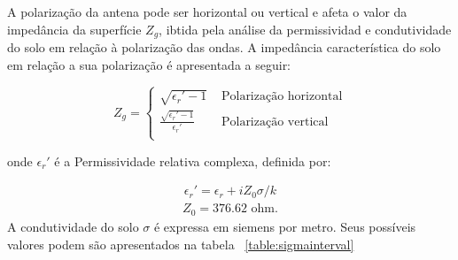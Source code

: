 A polarização da antena pode ser horizontal ou vertical e afeta o valor da impedância da superfície \begin{math}Z_g\end{math}, ibtida pela análise da permissividad e condutividade do solo em relação à polarização das ondas. A impedância característica do solo em relação a sua polarização é apresentada a seguir:

\[
	      Z_g = \begin{cases} 
	 \sqrt{\epsilon_r' - 1} & \textrm{ Polarização horizontal} \\
       \frac{\sqrt{\epsilon_r' - 1}}{\epsilon_r'} & \textrm{ Polarização vertical} \\
   	\end{cases}
\]

onde \begin{math}\epsilon_r'\end{math} é a Permissividade relativa complexa, definida por:

\begin{align}
\label{eps_r} \epsilon_r' = \epsilon_r + i Z_0\sigma/k
\end{align}
\begin{align}
\label{z_0} Z_0 = 376.62 \textrm{ ohm.}
\end{align}
A condutividade do solo $\sigma$ é expressa em siemens por metro. Seus possíveis valores podem são apresentados na tabela ~\ref{table:sigmainterval}

\begin{table}[h]
\caption[Valores para a permissividade relativa e condutividade do solo.]
{Valores para a permissividade relativa e condutividade do solo.}
\label{table:sigmainterval}
\centering
{}
\end{table}

